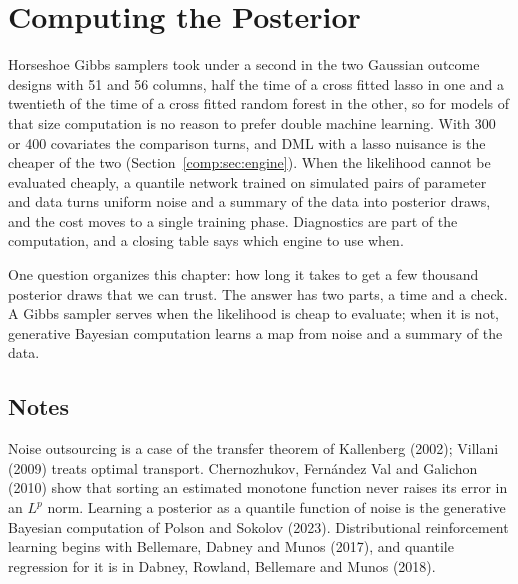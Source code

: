 \chapter{Computing the Posterior}\label{ch:computation}

\begin{tcolorbox}[colback=gray!6,colframe=gray!50,title=In brief,fonttitle=\normalfont\itshape,coltitle=black,colbacktitle=gray!15,boxrule=0.4pt,arc=1pt]
Horseshoe Gibbs samplers took under a second in the two Gaussian outcome designs with 51 and 56 columns, half the time of a cross fitted lasso in one and a twentieth of the time of a cross fitted random forest in the other, so for models of that size computation is no reason to prefer double machine learning. With 300 or 400 covariates the comparison turns, and DML with a lasso nuisance is the cheaper of the two (Section~\ref{comp:sec:engine}). When the likelihood cannot be evaluated cheaply, a quantile network trained on simulated pairs of parameter and data turns uniform noise and a summary of the data into posterior draws, and the cost moves to a single training phase. Diagnostics are part of the computation, and a closing table says which engine to use when.
\end{tcolorbox}

One question organizes this chapter: how long it takes to get a few thousand posterior draws that we can trust. The answer has two parts, a time and a check. A Gibbs sampler serves when the likelihood is cheap to evaluate; when it is not, generative Bayesian computation learns a map from noise and a summary of the data.












\section*{Notes}
Noise outsourcing is a case of the transfer theorem of Kallenberg (2002); Villani (2009) treats optimal transport. Chernozhukov, Fern\'andez Val and Galichon (2010) show that sorting an estimated monotone function never raises its error in an $L^p$ norm. Learning a posterior as a quantile function of noise is the generative Bayesian computation of Polson and Sokolov (2023). Distributional reinforcement learning begins with Bellemare, Dabney and Munos (2017), and quantile regression for it is in Dabney, Rowland, Bellemare and Munos (2018).

